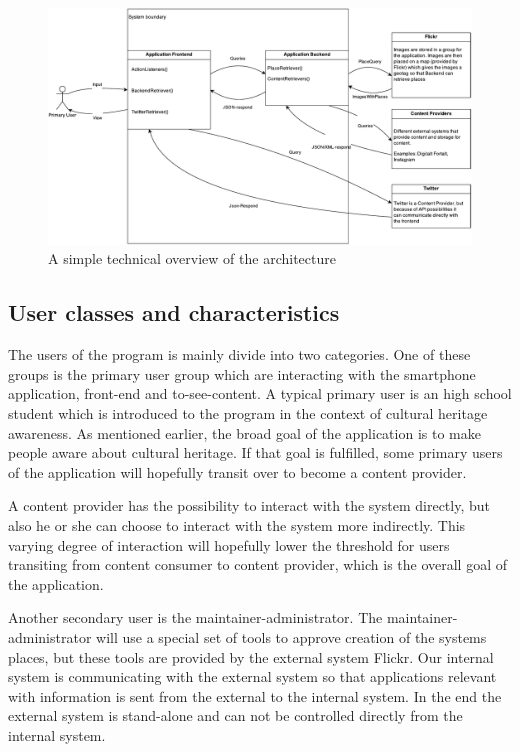 \begin{figure}[h!]
\begin{center}
\includegraphics[scale=0.6]{tooverview-architecture}
\caption{A simple technical overview of the architecture}
\label{fig:fig1}
\end{center}
\end{figure}

\subsection{User classes and characteristics}
The users of the program is mainly divide into two categories. One of these groups is the primary user group which are interacting with the smartphone application, front-end and to-see-content. A typical primary user is an high school student which is introduced to the program in the context of cultural heritage awareness. As mentioned earlier, the broad goal of the application is to make people aware about cultural heritage. If that goal is fulfilled, some primary users of the application will hopefully transit over to become a content provider. 

\noindent

A content provider has the possibility to interact with the system directly, but also he or she can choose to interact with the system more indirectly. This varying degree of interaction will hopefully lower the threshold for users transiting from content consumer to content provider, which is the overall goal of the application. 

\noindent

Another secondary user is the maintainer-administrator. The maintainer-administrator will use a special set of tools to approve creation of the systems places, but these tools are provided by the external system Flickr. Our internal system is communicating with the external system so that applications relevant with information is sent from the external to the internal system. In the end the external system is stand-alone and can not be controlled directly from the internal system. 

